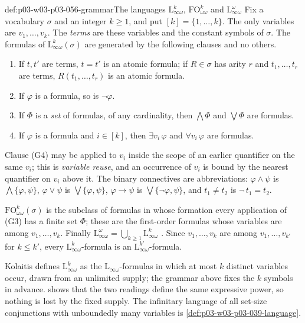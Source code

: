 \begin{hbdefinition}{def:p03-w03-p03-056-grammar}{The languages \(\mathrm{L}^k_{\infty\omega}\), \(\mathrm{FO}^k_{\omega\omega}\) and \(\mathrm{L}^\omega_{\infty\omega}\)}
Fix a vocabulary \(\sigma\) and an integer \(k\geq1\), and put
\([k]=\{1,\ldots,k\}\). The only variables are \(v_1,\ldots,v_k\). The
\emph{terms} are these variables and the constant symbols of \(\sigma\).
The formulas of \(\mathrm{L}^k_{\infty\omega}(\sigma)\) are generated by
the following clauses and no others.
\begin{enumerate}
\item[(G1)] If \(t,t'\) are terms, \(t=t'\) is an atomic formula; if
      \(R\in\sigma\) has arity \(r\) and \(t_1,\ldots,t_r\) are terms,
      \(R(t_1,\ldots,t_r)\) is an atomic formula.
\item[(G2)] If \(\varphi\) is a formula, so is \(\neg\varphi\).
\item[(G3)] If \(\Phi\) is a \emph{set} of formulas, of any cardinality, then
      \(\bigwedge\Phi\) and \(\bigvee\Phi\) are formulas.
\item[(G4)] If \(\varphi\) is a formula and \(i\in[k]\), then
      \(\exists v_i\,\varphi\) and \(\forall v_i\,\varphi\) are formulas.
\end{enumerate}
Clause (G4) may be applied to \(v_i\) inside the scope of an earlier
quantifier on the same \(v_i\); this is \emph{variable reuse}, and an
occurrence of \(v_i\) is bound by the nearest quantifier on \(v_i\) above
it. The binary connectives are abbreviations: \(\varphi\land\psi\) is
\(\bigwedge\{\varphi,\psi\}\), \(\varphi\lor\psi\) is
\(\bigvee\{\varphi,\psi\}\), \(\varphi\to\psi\) is
\(\bigvee\{\neg\varphi,\psi\}\), and \(t_1\neq t_2\) is \(\neg\,t_1=t_2\).

\(\mathrm{FO}^k_{\omega\omega}(\sigma)\) is the subclass of formulas in whose
formation every application of (G3) has a finite set \(\Phi\); these are the
first-order formulas whose variables are among \(v_1,\ldots,v_k\). Finally
\(\mathrm{L}^\omega_{\infty\omega}=\bigcup_{k\geq1}\mathrm{L}^k_{\infty\omega}\)
\cite[Def.~7.1, pp.~52--53]{Kolaitis2003ExpressivePowerNotes}. Since
\(v_1,\ldots,v_k\) are among \(v_1,\ldots,v_{k'}\) for \(k\leq k'\), every
\(\mathrm{L}^k_{\infty\omega}\)-formula is an
\(\mathrm{L}^{k'}_{\infty\omega}\)-formula.
\end{hbdefinition}

Kolaitis defines \(\mathrm{L}^k_{\infty\omega}\) as the
\(\mathrm{L}_{\infty\omega}\)-formulas in which at most \(k\) distinct
variables occur, drawn from an unlimited supply; the grammar above fixes the
\(k\) symbols in advance.  shows that the
two readings define the same expressive power, so nothing is lost by the
fixed supply. The infinitary language of all set-size conjunctions with
unboundedly many variables is \cref{def:p03-w03-p03-039-language}.

